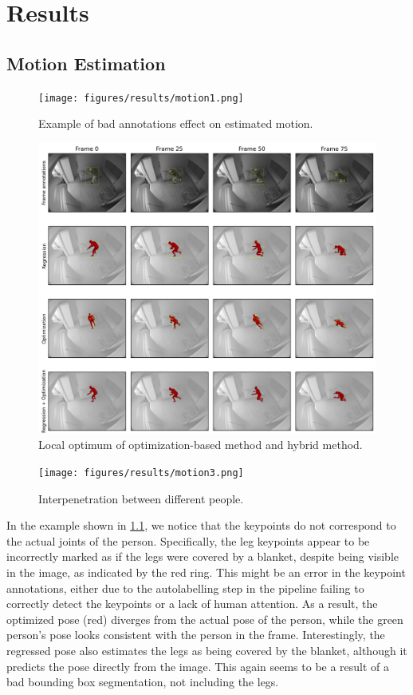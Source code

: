 \chapter{Results}
\section*{Motion Estimation}
\begin{figure}
    \centering
    \texttt{[image: figures/results/motion1.png]}
    \caption{Example of bad annotations effect on estimated motion.}
    \label{fig:motion1}
\end{figure}

\begin{figure}
    \centering
    \includegraphics[width=\linewidth]{figures/results/motion2.png}
    \caption{Local optimum of optimization-based method and hybrid method.}
    \label{fig:motion2}
\end{figure}

\begin{figure}
    \centering
    \texttt{[image: figures/results/motion3.png]}
    \caption{Interpenetration between different people.}
    \label{fig:motion3}
\end{figure}

In the example shown in \cref{fig:motion1}, we notice that the keypoints do not correspond to the actual joints of the person. Specifically, the leg keypoints appear to be incorrectly marked as if the legs were covered by a blanket, despite being visible in the image, as indicated by the red ring. This might be an error in the keypoint annotations, either due to the autolabelling step in the pipeline failing to correctly detect the keypoints or a lack of human attention. As a result, the optimized pose (red) diverges from the actual pose of the person, while the green person's pose looks consistent with the person in the frame. Interestingly, the regressed pose also estimates the legs as being covered by the blanket, although it predicts the pose directly from the image. This again seems to be a result of a bad bounding box segmentation, not including the legs.

